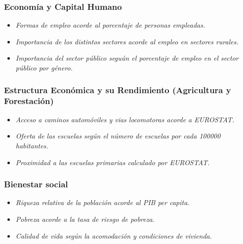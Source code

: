 \documentclass[stu, 12pt, letterpaper, donotrepeattitle, floatsintext, natbib]{apa7}
\begin{document}
\subsubsection{Economía y Capital Humano}
\begin{justifying}
    \begin{itemize}
        \item \emph{Formas de empleo acorde al porcentaje de personas empleadas.}
        \item \emph{Importancia de los distintos sectores acorde al empleo en sectores rurales.}
        \item \emph{Importancia del sector público seguún el porcentaje de empleo en el sector público por género.}
    \end{itemize}\par
\end{justifying}
\vspace{\baselineskip}
\subsubsection{Estructura Económica y su Rendimiento (Agricultura y Forestación)}
\begin{justifying}
    \begin{itemize}
        \item \emph{Acceso a caminos automóviles y vias locomotoras acorde a EUROSTAT.}
        \item \emph{Oferta de las escuelas según el número de escuelas por cada 100000 habitantes.}
        \item \emph{Proximidad a las escuelas primarias calculado por EUROSTAT.}
    \end{itemize}\par
\end{justifying}
\vspace{\baselineskip}
\subsubsection{Bienestar social}
\begin{justifying}
    \begin{itemize}
        \item \emph{Riqueza relativa de la población acorde al PIB per capita.}
        \item \emph{Pobreza acorde a la tasa de riesgo de pobreza.}
        \item \emph{Calidad de vida según la acomodación y condiciones de vivienda.}
    \end{itemize}\par
\end{justifying}
\vspace{\baselineskip}
\end{document}
